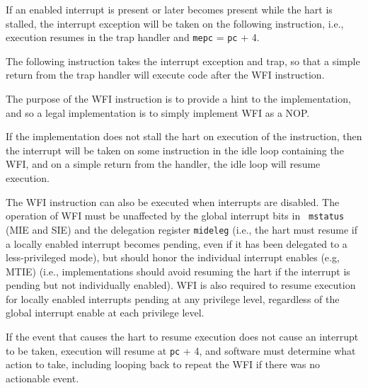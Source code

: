 If an enabled interrupt is present or later becomes present while the
hart is stalled, the interrupt exception will be taken on the
following instruction, i.e., execution resumes in the trap handler and
{\tt mepc} = {\tt pc} + 4.

\begin{commentary}
The following instruction takes the interrupt exception and trap, so
that a simple return from the trap handler will execute code after the
WFI instruction.
\end{commentary}

The purpose of the WFI instruction is to provide a hint to the implementation,
and so a legal implementation is to simply implement WFI as a NOP.

\begin{commentary}
If the implementation does not stall the hart on execution of the
instruction, then the interrupt will be taken on some instruction in
the idle loop containing the WFI, and on a simple return from the
handler, the idle loop will resume execution.
\end{commentary}

The WFI instruction can also be executed when interrupts are disabled.  The
operation of WFI must be unaffected by the global interrupt bits in {\tt
mstatus} (MIE and SIE) and the delegation register {\tt mideleg}
(i.e., the hart must resume if a locally enabled interrupt becomes pending,
even if it has been delegated to a less-privileged mode), but should honor the
individual interrupt enables (e.g, MTIE) (i.e., implementations should
avoid resuming the hart if the interrupt is pending but not
individually enabled).  WFI is also required to resume execution for
locally enabled interrupts pending at any privilege level, regardless
of the global interrupt enable at each privilege level.

If the event that causes the hart to resume execution does not cause
an interrupt to be taken, execution will resume at {\tt pc} + 4, and
software must determine what action to take, including looping back to
repeat the WFI if there was no actionable event.

